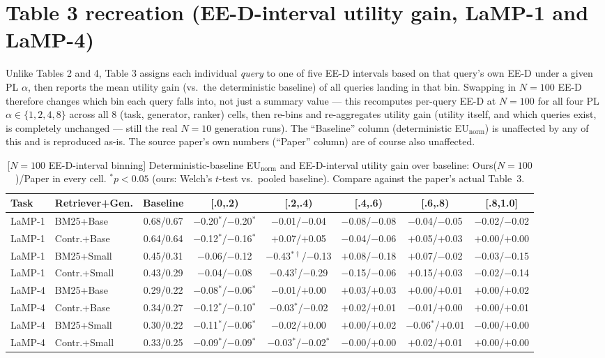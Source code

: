 \documentclass[10pt]{article}
\begin{document}
\FloatBarrier
\section{Table 3 recreation (EE-D-interval utility gain, LaMP-1 and LaMP-4)}

Unlike Tables 2 and 4, Table 3 assigns each individual \emph{query} to one of five
EE-D intervals based on that query's own EE-D under a given PL $\alpha$, then
reports the mean utility gain (vs.\ the deterministic baseline) of all queries
landing in that bin. Swapping in $N{=}100$ EE-D therefore changes which bin each
query falls into, not just a summary value --- this recomputes per-query EE-D at
$N{=}100$ for all four PL $\alpha\in\{1,2,4,8\}$ across all 8 (task, generator,
ranker) cells, then re-bins and re-aggregates utility gain (utility itself, and
which queries exist, is completely unchanged --- still the real $N{=}10$ generation
runs). The ``Baseline'' column (deterministic EU$_{\text{norm}}$) is unaffected by
any of this and is reproduced as-is. The source paper's own numbers (``Paper''
column) are of course also unaffected.

\begin{table}[h]
\centering
\scriptsize
\caption{[$N{=}100$ EE-D-interval binning] Deterministic-baseline EU$_{\text{norm}}$
and EE-D-interval utility gain over baseline: Ours($N{=}100$)/Paper in every cell.
$^*p{<}0.05$ (ours: Welch's $t$-test vs.\ pooled baseline). Compare against the
paper's actual Table~3.}
\begin{tabular}{@{}llcccccc@{}}
\toprule
Task & Retriever+Gen. & Baseline & [.0,.2) & [.2,.4) & [.4,.6) & [.6,.8) & [.8,1.0] \\
\midrule
LaMP-1 & BM25+Base   & 0.68/0.67 & $-$0.20$^{*}$/$-$0.20$^{*}$ & $-$0.01/$-$0.04 & $-$0.08/$-$0.08 & $-$0.04/$-$0.05 & $-$0.02/$-$0.02 \\
LaMP-1 & Contr.+Base & 0.64/0.64 & $-$0.12$^{*}$/$-$0.16$^{*}$ & $+$0.07/$+$0.05 & $-$0.04/$-$0.06 & $+$0.05/$+$0.03 & $+$0.00/$+$0.00 \\
LaMP-1 & BM25+Small  & 0.45/0.31 & $-$0.06/$-$0.12 & $-$0.43$^{*\dagger}$/$-$0.13 & $+$0.08/$-$0.18 & $+$0.07/$-$0.02 & $-$0.03/$-$0.15 \\
LaMP-1 & Contr.+Small& 0.43/0.29 & $-$0.04/$-$0.08 & $-$0.43$^\dagger$/$-$0.29 & $-$0.15/$-$0.06 & $+$0.15/$+$0.03 & $-$0.02/$-$0.14 \\
\midrule
LaMP-4 & BM25+Base   & 0.29/0.22 & $-$0.08$^{*}$/$-$0.06$^{*}$ & $-$0.01/$+$0.00 & $+$0.03/$+$0.03 & $+$0.00/$+$0.01 & $+$0.00/$+$0.02 \\
LaMP-4 & Contr.+Base & 0.34/0.27 & $-$0.12$^{*}$/$-$0.10$^{*}$ & $-$0.03$^{*}$/$-$0.02 & $+$0.02/$+$0.01 & $-$0.01/$+$0.00 & $+$0.00/$+$0.01 \\
LaMP-4 & BM25+Small  & 0.30/0.22 & $-$0.11$^{*}$/$-$0.06$^{*}$ & $-$0.02/$+$0.00 & $+$0.00/$+$0.02 & $-$0.06$^{*}$/$+$0.01 & $-$0.00/$+$0.00 \\
LaMP-4 & Contr.+Small& 0.33/0.25 & $-$0.09$^{*}$/$-$0.09$^{*}$ & $-$0.03$^{*}$/$-$0.02$^{*}$ & $-$0.00/$+$0.00 & $+$0.02/$+$0.01 & $+$0.00/$+$0.00 \\
\bottomrule
\end{tabular}
\end{table}
\end{document}
